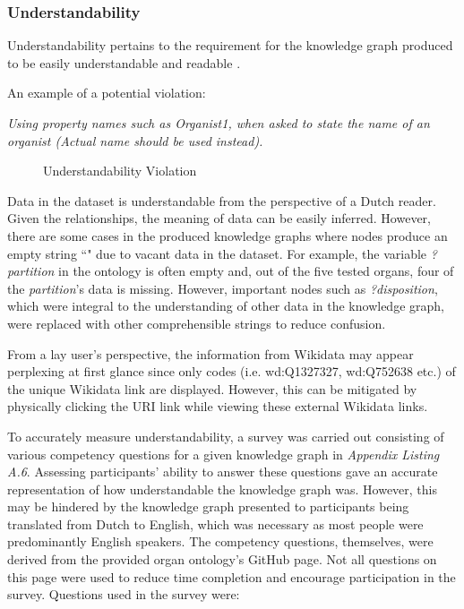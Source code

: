 \subsubsection{Understandability}
\hspace{0.5cm} Understandability pertains to the requirement for the knowledge graph produced to be easily understandable and readable \cite{knowledgegraphevaulationbook}.

\noindent An example of a potential violation: 
\vspace{-0.1cm}
\begin{displayquote}
    \textit{Using property names such as Organist1, when asked to state the name of an organist (Actual name should be used instead).}
\end{displayquote}

\begin{figure}[H]
\begin{center}
\end{center}
\vspace{-0.5cm}
\caption{Understandability Violation}
\end{figure}

Data in the dataset is understandable from the perspective of a Dutch reader. Given the relationships, the meaning of data can be easily inferred. However, there are some cases in the produced knowledge graphs where nodes produce an empty string ``" due to vacant data in the dataset. For example, the variable \textit{?partition} in the ontology is often empty and, out of the five tested organs, four of the \textit{partition}'s data is missing. However, important nodes such as \textit{?disposition}, which were integral to the understanding of other data in the knowledge graph, were replaced with other comprehensible strings to reduce confusion. 

From a lay user's perspective, the information from Wikidata may appear perplexing at first glance since only codes (i.e. wd:Q1327327, wd:Q752638 etc.) of the unique Wikidata link are displayed. However, this can be mitigated by physically clicking the URI link while viewing these external Wikidata links. 

To accurately measure understandability, a survey was carried out consisting of various competency questions for a given knowledge graph in \textit{Appendix Listing A.6}. Assessing participants' ability to answer these questions gave an accurate representation of how understandable the knowledge graph was. However, this may be hindered by the knowledge graph presented to participants being translated from Dutch to English, which was necessary as most people were predominantly English speakers. The competency questions, themselves, were derived from the provided organ ontology's GitHub page. Not all questions on this page were used to reduce time completion and encourage participation in the survey. Questions used in the survey were:

